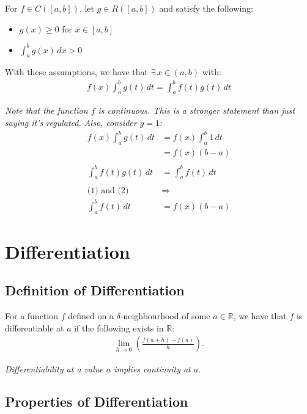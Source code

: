 \documentclass[a4paper, 12pt, twoside]{article}
\begin{document}
For $f \in C([a,b])$, let $g \in R([a, b])$ and satisfy the following:

\begin{itemize}
      \item $g(x) \geq 0$ for $x \in [a, b]$
      \item $\int_a^b g(x) \, dx > 0$
\end{itemize}

With these assumptions, we have that $\exists\, x \in (a, b)$ with:
\begin{align*}
      f(x) \int_a^b g(t) \, dt = \int_a^b f(t)g(t) \, dt
\end{align*}

\textit{Note that the function $f$ is continuous. This is a stronger
      statement than just saying it's regulated. Also, consider $g = 1$:}
\begin{align*}
      f(x) \int_a^b g(t) \, dt & = f(x) \int_a^b 1 \, dt \tag{1} \\
                               & = f(x) (b-a)                    \\
      \\
      \int_a^b f(t)g(t) \, dt  & = \int_a^b f(t) \, dt \tag{2}   \\
      \\
      \text{(1) and (2) }      & \Rightarrow                     \\
      \int_a^b f(t) \, dt      & = f(x)(b - a)
\end{align*}

\section{Differentiation}

\subsection{Definition of Differentiation}

For a function $f$ defined on a $\delta$-neighbourhood of some
$a \in \mathbb{R}$, we have that $f$ is differentiable at $a$ if
the following exists in $\mathbb{R}$:
\begin{align*}
      \lim_{h\to 0}\left(\frac{f(a + h) - f(a)}{h}\right).
\end{align*}

\textit{Differentiability at a value $a$ implies continuity at $a$.}

\subsection{Properties of Differentiation}
\end{document}
